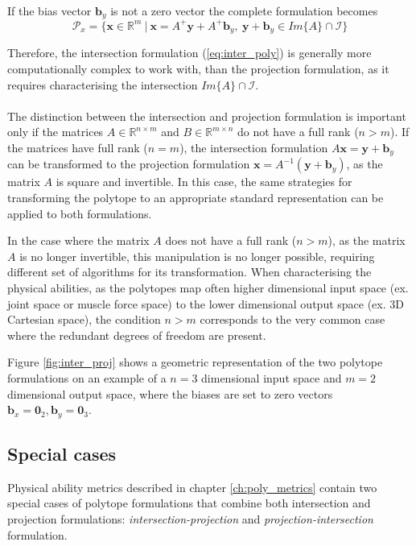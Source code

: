 If the bias vector $\bm{b}_y$ is not a zero vector the complete formulation becomes
\begin{equation}
\mathcal{P}_x=\{\bm{x} \in\mathbb{R}^m~|~ \bm{x} = A^+\bm{y} + A^+\bm{b}_y,~ \bm{y} + \bm{b}_y\in Im\{A\}\cap\mathcal{I}\} 
\end{equation}

Therefore, the intersection formulation (\ref{eq:inter_poly}) is generally more computationally complex to work with, than the projection formulation, as it requires characterising the intersection $Im\{A\}\cap\mathcal{I}$. 



\paragraph*{} The distinction between the intersection and projection formulation is important only if the matrices $A\in \mathbb{R}^{n\times m }$ and $B\in \mathbb{R}^{m\times n}$ do not have a full rank ($n\!>\!m$). If the matrices have full rank ($n\!=\!m$), the intersection formulation $A\bm{x} = \bm{y} + \bm{b}_y$ can be transformed to the projection formulation $\bm{x} = A^{-1}(\bm{y}+\bm{b}_y)$, as the matrix $A$ is square and invertible. In this case, the same strategies for transforming the polytope to an appropriate standard representation can be applied to both formulations.

In the case where the matrix $A$ does not have a full rank ($n\!>\!m$), as the matrix $A$ is no longer invertible, this manipulation is no longer possible, requiring different set of algorithms for its transformation. When characterising the physical abilities, as the polytopes map often higher dimensional input space (ex. joint space or muscle force space) to the lower dimensional output space (ex. 3D Cartesian space), the condition $n\!>\!m$ corresponds to the very common case where the redundant degrees of freedom are present. 

Figure \ref{fig:inter_proj} shows a geometric representation of the two polytope formulations on an example of a $n=3$ dimensional input space and $m=2$ dimensional output space, where the biases are set to zero vectors $\bm{b}_x=\bm{0}_2,\bm{b}_y=\bm{0}_3$.

\subsection{Special cases}
\label{ch:combined_forms}
Physical ability metrics described in chapter \ref{ch:poly_metrics} contain two special cases of polytope formulations that combine both intersection and projection formulations: \textit{intersection-projection} and \textit{projection-intersection} formulation.

